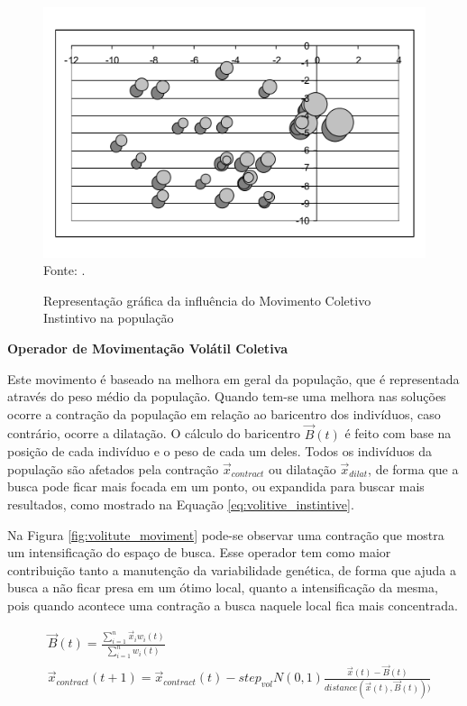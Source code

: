 \begin{figure}[!htb]
	\caption{Representação gráfica da influência do Movimento Coletivo Instintivo na população}
	\centering
	\includegraphics[scale=0.5]{images/movimento_coletivo.png}
	\label{fig:coletive_moviment}{\\Fonte: .}
\end{figure}

\noindent \textbf{Operador de Movimentação Volátil Coletiva}

Este movimento é baseado na melhora em geral da população, que é representada através do peso médio da população. Quando tem-se uma melhora nas soluções ocorre a contração da população em relação ao baricentro dos indivíduos, caso contrário, ocorre a dilatação. O cálculo do baricentro $\vec{B}(t)$ é feito com base na posição de cada indivíduo e o peso de cada um deles. Todos os indivíduos da população são afetados pela contração $\vec{x}_{contract}$ ou dilatação $\vec{x}_{dilat}$, de forma que a busca pode ficar mais focada em um ponto, ou expandida para buscar mais resultados, como mostrado na Equação \ref{eq:volitive_instintive}. 

Na Figura \ref{fig:volitute_moviment} pode-se observar uma contração que mostra um intensificação do espaço de busca. Esse operador tem como maior contribuição tanto a manutenção da variabilidade genética, de forma que ajuda a busca a não ficar presa em um ótimo local, quanto a intensificação da mesma, pois quando acontece uma contração a busca naquele local fica mais concentrada.

\begin{equation}
\label{eq:volitive_instintive}
\begin{split}
& \vec{B}(t) = \frac{\sum_{i=1}^{n} \vec{x}_i  w_i(t)}{\sum_{i=1}^{n} w_i(t)} \\
& \vec{x}_{contract}(t+1) = \vec{x}_{contract}(t) - step_{vol}N(0,1) \frac{\vec{x}(t)-\vec{B}(t)} {\textit{distance}(\vec{x}(t),\vec{B}(t)))}
\end{split}
\end{equation}

